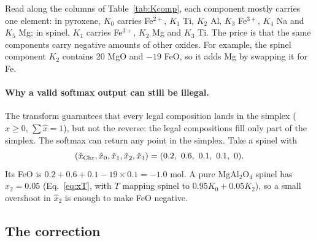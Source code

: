\documentclass[11pt]{article}
\begin{document}
Read along the columns of Table~\ref{tab:Kcomp}, each component mostly carries one element:
in pyroxene, $K_0$ carries Fe$^{2+}$, $K_1$ Ti, $K_2$ Al, $K_3$ Fe$^{3+}$, $K_4$ Na and
$K_5$ Mg; in spinel, $K_1$ carries Fe$^{3+}$, $K_2$ Mg and $K_3$ Ti. The price is that the
same components carry negative amounts of other oxides. For example, the spinel component
$K_2$ contains 20 MgO and $-19$ FeO, so it adds Mg by swapping it for Fe.

\paragraph{Why a valid softmax output can still be illegal.} The transform guarantees that
every legal composition lands in the simplex ($\hat x \ge 0$, $\sum\hat x = 1$), but not
the reverse: the legal compositions fill only part of the simplex. The softmax can return
any point in the simplex. Take a spinel with
\begin{equation}
  (\hat x_{\rm Chr}, \hat x_0, \hat x_1, \hat x_2, \hat x_3) = (0.2,\ 0.6,\ 0.1,\ 0.1,\ 0).
  \label{eq:spex}
\end{equation}
Its FeO is $0.2 + 0.6 + 0.1 - 19 \times 0.1 = -1.0$ mol. A pure MgAl$_2$O$_4$ spinel has
$\hat x_2 = 0.05$ (Eq.~\ref{eq:xT}, with $T$ mapping spinel to $0.95K_0 + 0.05K_2$), so a
small overshoot in $\hat x_2$ is enough to make FeO negative.

\subsection{The correction}
\end{document}
